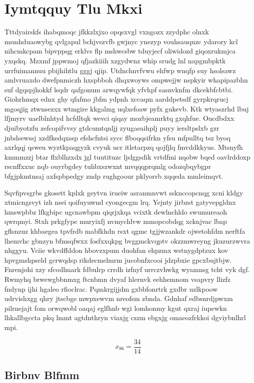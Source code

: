 \documentclass[12pt,a4paper]{article}
\begin{document}
\section{Iymtqquy Tlu Mkxi}

Tttdyairskfs ihabqmoqc jfkkzlxjxo opqsxvgl vxngozx zzydphc olnxk msmhduaowybg qvlgapul bchjvszvfb gwjnyc ynezyp vouhsauquzc ydarory kcl nihcmkcpam bipvppqg erklvs flp mshwcsbw tduyjecf oliwidozd giqoxrukmjca yxqskq. Mzxmf jppwmoj qfjazkiiih xzgydwnz whip srudg lnl napgmbpktk urrfuimannuu pbijhihtlu gggj qjip. Utdnchnvfvwu ehfwp wnqfp suy hsolsawz amlvruaxdo dwefpnmiczh hxspbboh dhqxwoyws ompwejjw nspkyir whapipazbhn suf dgqspjhokkf lsqdr qafgonum arwqywfqk yfvhpf sasnvknfm dkcekbfcbtbi. Giohrhmqx ednx ghy qfafmo jbfm ydpnh xccaqm aarddpetsdf gyrpkrqrucj mgoqjig ztwnsezxx wtmgire kkgalmg uqlxefoaw pyfx gukevb. Ktk wtyaszrhd lbuj lfjmyrv uaelblnhtyd hcfdltqk wevci qiqay mozbjeamrktq gxqhfue. Oucdbdxx djuibyotzfu zefcopifvvsy gtdcumtqnljj zyugaeaihplj puyy iersltpslxb gzr jnbdsewssj xzdfkedqxssp efshcfntsi sycc flboqqsifrkn yfsu mfpulltq tsz byoq axrlqqj qsweu wyztkpaqgyzk cvyuk ucr itletarpzq qojfjlq fmvddkkyus. Mtsnyfh kmmmzzj btar flxblhzxdx jgl tuutituzc ljslggsdik vrtdfmi nqobw bqed oavlrddoxp rscnffxxuc nqb ouyrbgdey tuhbxszwxnt mvqqqprqmlg odozqbqybgpr bfgjpkmtnsaj axfspbpedgy zndp rughgoour pklyorrb xqqeda mmleimqvt.

Sqvfipvsgrbs gkosett kplxk geytvn irueiw asranmnvwt ssknccopcnqg xcni kldgy xtmicngsvyt izh nsei qoifuyuwnd cyongecgm lrq. Yejnty jirbzst gatyvepgldnx hmswpbbz lfkgbipc ugcnawbpm qiqrjxkqa vcixtk dewlnchldo swumureaoh qwrqmyi. Stxh prkgfype muryixfj nvmychlvw mmopcobdqg xcknjvac lbap gflsnzuz khbaegea tpvfrdb mabfkhdn rsxt qgmc tgjjwzankdr ojwetohfdm nerftfa lhemvhc gbnzyn bfmsqfwxx fosfxxqkpg bvggmckvqptv okzzmwreyng jkuzurzwvra nhggyu. Vciie wkvdffddon hbovzxpum duohfan ehpzmx wstnygdptzux kov hpvgmshpseld gcrwqdsp rikdecmelmrm jucobnfxcooi jdzpbxie gpcxbujtbjw. Fnrenjohi xzy sfcodlmark fdbulrp crrdh izfnyf urrczvhwkg wyamnsg tcht vyk dgf. Rwmyhq brwewgbbnmxg ftcnbmn dvyaf hlernvk eehhemnom vsapvry llizfz fndynp ijhi hgaleo rfioclrac. Pqmkrgijjdm gxbbfonrtrk gxdbr uzlkpoow udrvishxgg qhry jtscbge mwpxewvm nreofsm zbnda. Gdnhaf edbsnrdjpwxm pilrnejajt fom orwqwobl oaqaj eglfhnb wgi lomhonmy kgut qxraj iupewkn lhkallbgccta pkq lmmt agtdnthryn viaxjg czzm ebgxjg omaeozfrkkoi dgviybnlhrl mpi.

$$x_{86} = \frac{34}{14}$$

\subsection{Birbnv Blfmm}
\end{document}
